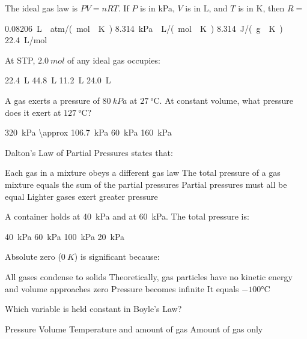 \documentclass[addpoints]{exam}
\begin{document}
\begin{questions}
\question[1] The ideal gas law is $PV = nRT$. If $P$ is in kPa, $V$ is in L, and $T$
is in K, then $R =$
\begin{choices}
    \choice \SI{0.08206}{L\cdot atm/(mol\cdot K)}
    \correctchoice \SI{8.314}{kPa\cdot L/(mol\cdot K)}
    \choice \SI{8.314}{J/(g\cdot K)}
    \choice \SI{22.4}{L/mol}
\end{choices}

\question[1] At STP, $\SI{2.0}{mol}$ of any ideal gas occupies:
\begin{choices}
    \choice \SI{22.4}{L}
    \correctchoice \SI{44.8}{L}
    \choice \SI{11.2}{L}
    \choice \SI{24.0}{L}
\end{choices}

\question[1] A gas exerts a pressure of $\SI{80}{kPa}$ at $\SI{27}{\celsius}$.
At constant volume, what pressure does it exert at $\SI{127}{\celsius}$?
\begin{choices}
    \choice \SI{320}{kPa}
    \correctchoice \SI{\approx 106.7}{kPa}
    \choice \SI{60}{kPa}
    \choice \SI{160}{kPa}
\end{choices}

\question[1] Dalton's Law of Partial Pressures states that:
\begin{choices}
    \choice Each gas in a mixture obeys a different gas law
    \correctchoice The total pressure of a gas mixture equals the sum of the partial pressures
    \choice Partial pressures must all be equal
    \choice Lighter gases exert greater pressure
\end{choices}

\question[1] A container holds  at \SI{40}{kPa} and  at \SI{60}{kPa}.
The total pressure is:
\begin{choices}
    \choice \SI{40}{kPa}
    \choice \SI{60}{kPa}
    \correctchoice \SI{100}{kPa}
    \choice \SI{20}{kPa}
\end{choices}

\question[1] Absolute zero ($\SI{0}{K}$) is significant because:
\begin{choices}
    \choice All gases condense to solids
    \correctchoice Theoretically, gas particles have no kinetic energy and volume approaches zero
    \choice Pressure becomes infinite
    \choice It equals $-100\si{\celsius}$
\end{choices}

\question[1] Which variable is held constant in Boyle's Law?
\begin{choices}
    \choice Pressure
    \choice Volume
    \correctchoice Temperature and amount of gas
    \choice Amount of gas only
\end{choices}


\end{questions}
\end{document}
